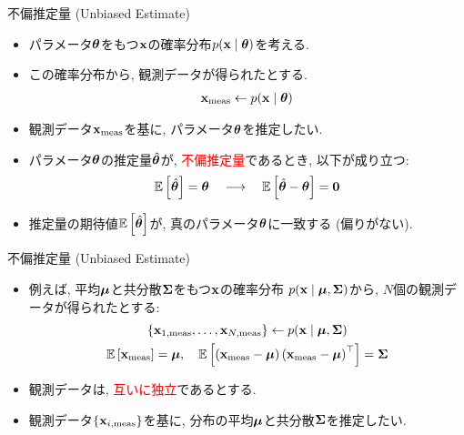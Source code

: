 \documentclass[dvipdfmx,notheorems,t]{beamer}
\begin{document}
\begin{frame}{不偏推定量 (Unbiased Estimate)}
\begin{itemize}
  \item パラメータ$\vb*{\theta}$をもつ$\vb{x}$の確率分布$p(\vb{x} \mid \vb*{\theta})$を考える.
  \item この確率分布から, 観測データが得られたとする.
  \begin{align*}
    \vb{x}_\mathrm{meas} \gets p(\vb{x} \mid \vb*{\theta})
  \end{align*}
  \item 観測データ$\vb{x}_\mathrm{meas}$を基に, パラメータ$\vb*{\theta}$を推定したい.
  \item パラメータ$\vb*{\theta}$の推定量$\hat{\vb*{\theta}}$が,
  \textcolor{red}{不偏推定量}であるとき, 以下が成り立つ:
  \begin{align*}
    \operatorname{\mathbb{E}} \left[ \hat{\vb*{\theta}} \right] = \vb*{\theta}
      \quad \longrightarrow \quad \operatorname{\mathbb{E}} \left[ \hat{\vb*{\theta}} - \vb*{\theta} \right] = \vb{0}
  \end{align*}
  \item 推定量の期待値$\operatorname{\mathbb{E}} \left[ \hat{\vb*{\theta}} \right]$が, 真のパラメータ$\vb*{\theta}$に一致する (偏りがない).
\end{itemize}
\end{frame}

\begin{frame}{不偏推定量 (Unbiased Estimate)}
\begin{itemize}
  \item 例えば, 平均$\vb*{\mu}$と共分散$\vb{\Sigma}$をもつ$\vb{x}$の確率分布
  $p(\vb{x} \mid \vb*{\mu}, \vb{\Sigma})$から, $N$個の観測データが得られたとする:
  \begin{gather*}
    \left\{ \vb{x}_{1, \mathrm{meas}}, \ldots, \vb{x}_{N, \mathrm{meas}} \right\}
      \gets p(\vb{x} \mid \vb*{\mu}, \vb{\Sigma}) \\
    \operatorname{\mathbb{E}} \left[ \vb{x}_\mathrm{meas} \right] = \vb*{\mu}, \quad
    \operatorname{\mathbb{E}} \left[ \left( \vb{x}_\mathrm{meas} - \vb*{\mu} \right)
      \left( \vb{x}_\mathrm{meas} - \vb*{\mu} \right)^\top \right] = \vb{\Sigma}
  \end{gather*}
  \item 観測データは, \textcolor{red}{互いに独立}であるとする.
  \item 観測データ$\{ \vb{x}_{i, \mathrm{meas}} \}$を基に,
  分布の平均$\vb*{\mu}$と共分散$\vb{\Sigma}$を推定したい.
\end{itemize}
\end{frame}
\end{document}

